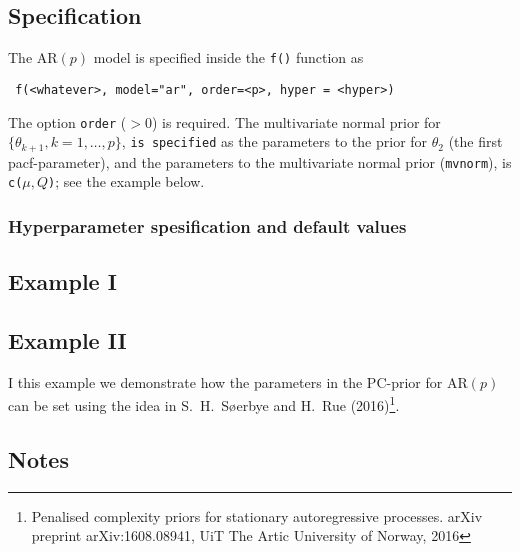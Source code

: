 \documentclass[a4paper,11pt]{article}
\begin{document}
\subsection*{Specification}

The AR$(p)$ model is specified inside the {\tt f()} function as
\begin{verbatim}
 f(<whatever>, model="ar", order=<p>, hyper = <hyper>)
\end{verbatim}
The option \texttt{order} ($>0$) is required. The multivariate normal
prior for $\{\theta_{k+1}, k=1, \ldots, p\}$, \texttt{is specified} as
the parameters to the prior for $\theta_{2}$ (the first
pacf-parameter), and the parameters to the multivariate normal prior
(\texttt{mvnorm}), is \texttt{c($\mu, Q$)}; see the example below.

\subsubsection*{Hyperparameter spesification and default values}


\clearpage
\subsection*{Example I}


\clearpage
\subsection*{Example II}

I this example we demonstrate how the parameters in the PC-prior for
AR$(p)$ can be set using the idea in {S.~H.~S{\o}erbye and H.~Rue
    (2016)}\footnote{Penalised complexity priors for stationary
    autoregressive processes. arXiv preprint arXiv:1608.08941, UiT The
    Artic University of Norway, 2016}.
    


\clearpage
\subsection*{Notes}
\end{document}
